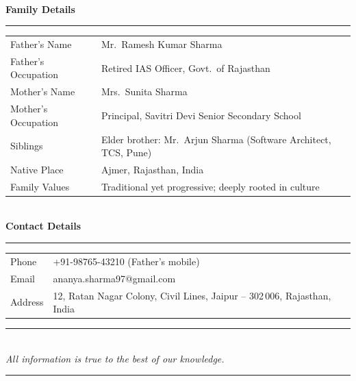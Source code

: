 \documentclass[a4paper,10pt]{article}
\newcommand{\biosection}[1]{%
  \vspace{3pt}%
  \noindent{\color{gold}\rule{\linewidth}{0.55pt}}\\[-2pt]
  {\color{maroon}\small\ding{70}\enspace\textbf{#1}}%
  \\[-3pt]
  {\color{gold}\rule{\linewidth}{0.35pt}}%
  \vspace{1pt}%
}
\begin{document}
\biosection{Family Details}

\noindent
\begin{tabularx}{\linewidth}{KV}
  Father's Name       & Mr.\ Ramesh Kumar Sharma \\
  Father's Occupation & Retired IAS Officer, Govt.\ of Rajasthan \\
  Mother's Name       & Mrs.\ Sunita Sharma \\
  Mother's Occupation & Principal, Savitri Devi Senior Secondary School \\
  Siblings            & Elder brother: Mr.\ Arjun Sharma (Software Architect, TCS, Pune) \\
  Native Place        & Ajmer, Rajasthan, India \\
  Family Values       & Traditional yet progressive; deeply rooted in culture \\
\end{tabularx}

\biosection{Contact Details}

\noindent
\begin{tabularx}{\linewidth}{KV}
  Phone   & +91-98765-43210 (Father's mobile) \\
  Email   & ananya.sharma97@gmail.com \\
  Address & 12, Ratan Nagar Colony, Civil Lines, Jaipur -- 302\,006, Rajasthan, India \\
\end{tabularx}

\vspace{4pt}

\begin{center}
  {\color{gold}\rule{0.56\linewidth}{0.55pt}}\\[2pt]
  {\color{maroon!70}\footnotesize{}\enspace
   \textit{All information is true to the best of our knowledge.}%
   \enspace{}}\\[2pt]
  {\color{gold}\rule{0.56\linewidth}{0.55pt}}
\end{center}
\end{document}
